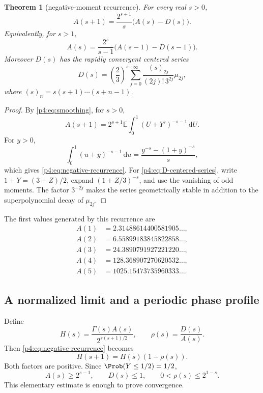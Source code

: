 \documentclass[11pt,oneside]{article}
\newtheorem{theorem}{Theorem}[section]
\theoremstyle{definition}
\theoremstyle{remark}
\newcommand{\E}{\mathbb E}
\newcommand{\dd}{\,\mathrm d}
\newcommand{\1}{\mathbf 1}
\begin{document}
\begin{theorem}[negative-moment recurrence]\label{p4:thm:negative-recurrence}
For every real \(s>0\),
\begin{equation}\label{p4:eq:negative-recurrence}
 A(s+1)=\frac{2^{s+1}}s\bigl(A(s)-D(s)\bigr).
\end{equation}
Equivalently, for \(s>1\),
\begin{equation}\label{p4:eq:negative-recurrence-shifted}
 A(s)=\frac{2^s}{s-1}\bigl(A(s-1)-D(s-1)\bigr).
\end{equation}
Moreover \(D(s)\) has the rapidly convergent centered series
\begin{equation}\label{p4:eq:D-centered-series}
 D(s)=\left(\frac23\right)^s
 \sum_{j=0}^{\infty}
 \frac{(s)_{2j}}{(2j)!\,3^{2j}}\mu_{2j},
\end{equation}
where \((s)_n=s(s+1)\cdots(s+n-1)\).
\end{theorem}

\begin{proof}
By \cref{p4:eq:smoothing}, for \(s>0\),
\[
 A(s+1)=2^{s+1}\E\int_0^1(U+Y')^{-s-1}\dd U.
\]
For \(y>0\),
\[
 \int_0^1(u+y)^{-s-1}\dd u
 =\frac{y^{-s}-(1+y)^{-s}}s,
\]
which gives \cref{p4:eq:negative-recurrence}.  For \cref{p4:eq:D-centered-series}, write
\(1+Y=(3+Z)/2\), expand \((1+Z/3)^{-s}\), and use the vanishing of odd moments.
The factor \(3^{-2j}\) makes the series geometrically stable in addition to the
superpolynomial decay of \(\mu_{2j}\).
\end{proof}

The first values generated by this recurrence are
\begin{align}
 A(1)&=2.31488614400581905\ldots,\nonumber\\
 A(2)&=6.55899183845822858\ldots,\nonumber\\
 A(3)&=24.3890791927221220\ldots,\nonumber\\
 A(4)&=128.368907270620532\ldots,\nonumber\\
 A(5)&=1025.15473735960333\ldots.\label{p4:eq:negative-values}
\end{align}

\subsection{A normalized limit and a periodic phase profile}

Define
\begin{equation}\label{p4:eq:H-def}
 H(s)=\frac{\Gamma(s)A(s)}{2^{s(s+1)/2}},
 \qquad
 \rho(s)=\frac{D(s)}{A(s)}.
\end{equation}
Then \cref{p4:eq:negative-recurrence} becomes
\begin{equation}\label{p4:eq:H-recurrence}
 H(s+1)=H(s)(1-\rho(s)).
\end{equation}
Both factors are positive.  Since \(\Prob(Y\le1/2)=1/2\),
\begin{equation}\label{p4:eq:rho-bound}
 A(s)\ge2^{s-1},\qquad D(s)\le1,
 \qquad 0<\rho(s)\le2^{1-s}.
\end{equation}
This elementary estimate is enough to prove convergence.
\end{document}

